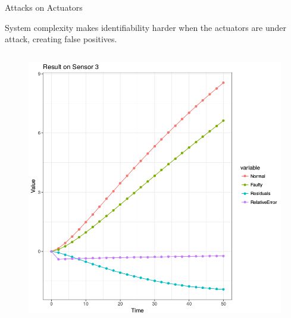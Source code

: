 \documentclass{beamer}
\begin{document}
\begin{frame}{Attacks on Actuators}

	\alert{System complexity makes identifiability harder when the actuators are
	under attack, creating false positives.}

	\begin{columns}
		\begin{column}{0.5\textwidth}
			\begin{figure}
				\includegraphics[width=\textwidth]{attack_valve}
				\label{fig:attack_valve}
			\end{figure}
		\end{column}


\end{columns}
\end{frame}
\end{document}
